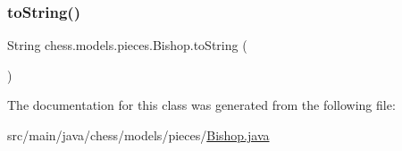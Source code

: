 \subsubsection{\texorpdfstring{to\+String()}{toString()}}
{\footnotesize\ttfamily String chess.\+models.\+pieces.\+Bishop.\+to\+String (\begin{DoxyParamCaption}{ }\end{DoxyParamCaption})}



The documentation for this class was generated from the following file\+:\begin{DoxyCompactItemize}
\item 
src/main/java/chess/models/pieces/\mbox{\hyperlink{_bishop_8java}{Bishop.\+java}}\end{DoxyCompactItemize}
